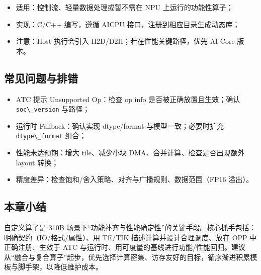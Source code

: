 \begin{itemize}
\tightlist
\item
  适用：控制流、轻量数据处理或暂不需在 NPU 上运行的功能性算子；
\item
  实现：C/C++ 编写，遵循 AICPU 接口，注册到相应目录生成动态库；
\item
  注意：Host 执行会引入 H2D/D2H；若在性能关键路径，优先 AI Core 版本。
\end{itemize}

\subsection{常见问题与排错}\label{ux5e38ux89c1ux95eeux9898ux4e0eux6392ux9519}

\begin{itemize}
\tightlist
\item
  ATC 提示 Unsupported Op：检查 op info 是否被正确放置且生效；确认
  \passthrough{\lstinline!soc\_version!} 与路径；
\item
  运行时 Fallback：确认实现 dtype/format 与模型一致；必要时扩充
  \passthrough{\lstinline!dtype\_format!} 组合；
\item
  性能未达预期：增大 tile、减少小块 DMA、合并计算、检查是否出现额外
  layout 转换；
\item
  精度差异：检查饱和/舍入策略、对齐与广播规则、数据范围（FP16 溢出）。
\end{itemize}

\subsection{本章小结}\label{ux672cux7ae0ux5c0fux7ed3}

自定义算子是 310B
场景下``功能补齐与性能确定性''的关键手段。核心抓手包括：明确契约（IO/格式/属性）、用
TE/TIK 描述计算并设计合理调度、放在 OPP 中正确注册、生效于 ATC
与运行时、用可度量的基线进行功能/性能回归。建议从``融合与复合算子''起步，优先选择计算密集、访存友好的目标，循序渐进积累模板与脚手架，以降低维护成本。
